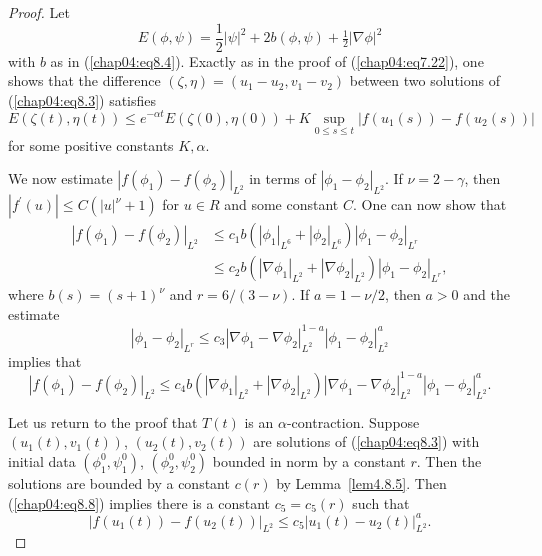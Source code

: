 \documentclass{surv-l}
\theoremstyle{plain}
\theoremstyle{definition}
\numberwithin{equation}{section}
\numberwithin{figure}{chapter}
\begin{document}
\begin{proof} Let
\begin{equation*}
E(\phi, \psi)={\textstyle\frac{1}{2}}|\psi|^{2}+2b(\phi, \psi)+{\tfrac{1}{2}}|\nabla\phi|^{2}
\end{equation*}
with $b$ as in (\ref{chap04:eq8.4}). Exactly as in the proof of (\ref{chap04:eq7.22}), one shows that the difference $(\zeta, \eta)=(u_{1}-u_{2}, v_{1}-v_{2})$ between two solutions of (\ref{chap04:eq8.3}) satisfies
\begin{equation}\label{chap04:eq8.7}
E(\zeta(t), \eta(t))\leq e^{-\alpha t}E(\zeta(0), \eta(0))+K\sup_{0\leq s\leq t}|f(u_{1}(s))-f(u_{2}(s))|
\end{equation}
for some positive constants $K, \alpha$.

We now estimate $|f(\phi_{1})-f(\phi_{2})|_{L^{2}}$ in terms of $|\phi_{1}-\phi_{2}|_{L^{2}}$. If $\nu =2-\gamma$, then $|f^{\prime}(u)|\leq C(|u|^{\nu}+1)$ for $u\in R$ and some constant $C$. One can now show that
\begin{align*}
|f(\phi_{1})-f(\phi_{2})|_{L^{2}}&\leq c_{1}b(|\phi_{1}|_{L^{6}}+|\phi_{2}|_{L^{6}})|\phi_{1}-\phi_{2}|_{L^{r}}\\
&\leq c_{2}b(|\nabla\phi_{1}|_{L^{2}}+|\nabla\phi_{2}|_{L^{2}})|\phi_{1}-\phi_{2}|_{L^{r}},
\end{align*}
where $b(s) = (s +1)^{\nu}$ and $r =6/(3 -\nu)$. If $a = 1 - \nu/2$, then $a > 0$ and the estimate
\begin{equation*}
|\phi_{1}-\phi_{2}|_{L^{r}}\leq c_{3}|\nabla\phi_{1}-\nabla\phi_{2}|_{L^{2}}^{1-a}|\phi_{1}-\phi_{2}|_{L^{2}}^{a}
\end{equation*}
implies that
\begin{equation}\label{chap04:eq8.8}
|f(\phi_{1})-f(\phi_{2})|_{L^{2}}\leq c_{4}b(|\nabla\phi_{1}|_{L^{2}}+|\nabla\phi_{2}|_{L^{2}})|\nabla\phi_{1}-\nabla\phi_{2}|_{L^{2}}^{1-a}|\phi_{1}-\phi_{2}|_{L^{2}}^{a}.
\end{equation}

Let us return to the proof that $T(t)$ is an $\alpha$-contraction. Suppose $(u_{1}(t), v_{1}(t))$, $(u_{2}(t), v_{2}(t))$ are solutions of (\ref{chap04:eq8.3}) with initial data $(\phi_{1}^{0}, \psi_{1}^{0})$, $(\phi_{2}^{0}, \psi_{2}^{0})$ bounded in norm by a constant $r$. Then the solutions are bounded by a constant $c(r)$ by Lemma~\ref{lem4.8.5}. Then (\ref{chap04:eq8.8}) implies there is a constant $c_{5}=c_{5}(r)$ such that
\begin{equation}\label{chap04:eq8.9}
|f(u_{1}(t))-f(u_{2}(t))|_{L^{2}}\leq c_{5}|u_{1}(t)-u_{2}(t)|_{L^{2}}^{a}.
\end{equation}


\end{proof}
\end{document}
